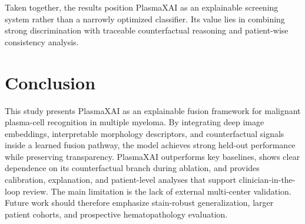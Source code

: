 \documentclass[runningheads]{llncs}
\begin{document}
Taken together, the results position PlasmaXAI as an explainable screening system rather than a narrowly optimized classifier. Its value lies in combining strong discrimination with traceable counterfactual reasoning and patient-wise consistency analysis.

\section{Conclusion}
This study presents PlasmaXAI as an explainable fusion framework for malignant plasma-cell recognition in multiple myeloma. By integrating deep image embeddings, interpretable morphology descriptors, and counterfactual signals inside a learned fusion pathway, the model achieves strong held-out performance while preserving transparency. PlasmaXAI outperforms key baselines, shows clear dependence on its counterfactual branch during ablation, and provides calibration, explanation, and patient-level analyses that support clinician-in-the-loop review. The main limitation is the lack of external multi-center validation. Future work should therefore emphasize stain-robust generalization, larger patient cohorts, and prospective hematopathology evaluation.
\end{document}

